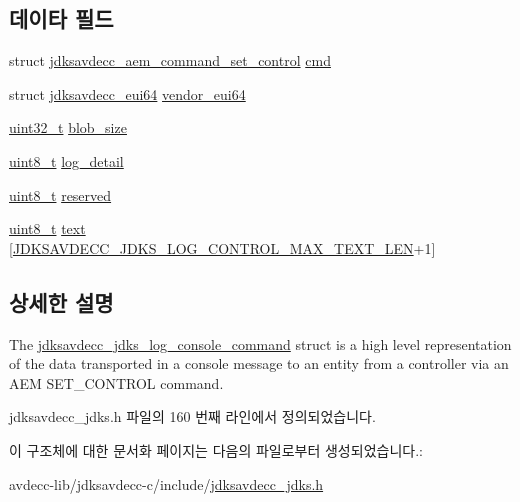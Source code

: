 \subsection*{데이타 필드}
\begin{DoxyCompactItemize}
\item 
struct \hyperlink{structjdksavdecc__aem__command__set__control}{jdksavdecc\+\_\+aem\+\_\+command\+\_\+set\+\_\+control} \hyperlink{group__jdks_ga0c878e1ddbac611b7218077c5c482cde}{cmd}
\item 
struct \hyperlink{structjdksavdecc__eui64}{jdksavdecc\+\_\+eui64} \hyperlink{group__jdks_ga6183c85748a8af0003d293d653c4ae9b}{vendor\+\_\+eui64}
\item 
\hyperlink{parse_8c_a6eb1e68cc391dd753bc8ce896dbb8315}{uint32\+\_\+t} \hyperlink{group__jdks_ga32143551b70893faef60f6e35f88ed50}{blob\+\_\+size}
\item 
\hyperlink{stdint_8h_aba7bc1797add20fe3efdf37ced1182c5}{uint8\+\_\+t} \hyperlink{group__jdks_ga61044f81305d515f41eea13f02f3cb81}{log\+\_\+detail}
\item 
\hyperlink{stdint_8h_aba7bc1797add20fe3efdf37ced1182c5}{uint8\+\_\+t} \hyperlink{group__jdks_gacb7bc06bed6f6408d719334fc41698c7}{reserved}
\item 
\hyperlink{stdint_8h_aba7bc1797add20fe3efdf37ced1182c5}{uint8\+\_\+t} \hyperlink{group__jdks_ga77513c59b654d8ce1e07a7f3bcdf70db}{text} \mbox{[}\hyperlink{group__jdks__log_gaaa43d62d581d06b4c563a3ac9f689730}{J\+D\+K\+S\+A\+V\+D\+E\+C\+C\+\_\+\+J\+D\+K\+S\+\_\+\+L\+O\+G\+\_\+\+C\+O\+N\+T\+R\+O\+L\+\_\+\+M\+A\+X\+\_\+\+T\+E\+X\+T\+\_\+\+L\+EN}+1\mbox{]}
\end{DoxyCompactItemize}


\subsection{상세한 설명}
The \hyperlink{structjdksavdecc__jdks__log__console__command}{jdksavdecc\+\_\+jdks\+\_\+log\+\_\+console\+\_\+command} struct is a high level representation of the data transported in a console message to an entity from a controller via an A\+EM S\+E\+T\+\_\+\+C\+O\+N\+T\+R\+OL command. 

jdksavdecc\+\_\+jdks.\+h 파일의 160 번째 라인에서 정의되었습니다.



이 구조체에 대한 문서화 페이지는 다음의 파일로부터 생성되었습니다.\+:\begin{DoxyCompactItemize}
\item 
avdecc-\/lib/jdksavdecc-\/c/include/\hyperlink{jdksavdecc__jdks_8h}{jdksavdecc\+\_\+jdks.\+h}\end{DoxyCompactItemize}
